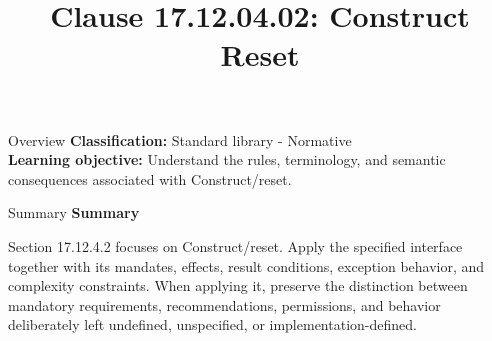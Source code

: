 \documentclass[10pt,letterpaper]{article}
\title{Clause 17.12.04.02: Construct Reset}
\author{}
\date{}
\begin{document}
\maketitle
\begin{CornellOverviewBox}{Overview}
\textbf{Classification:} Standard library - Normative\\[2pt]
\textbf{Learning objective:} Understand the rules, terminology, and semantic consequences associated with Construct/reset.
\end{CornellOverviewBox}\begin{CornellSummaryBox}{Summary}
{\sffamily\bfseries\color{Accent} Summary}\par\vspace{3pt}Section 17.12.4.2 focuses on Construct/reset. Apply the specified interface together with its mandates, effects, result conditions, exception behavior, and complexity constraints. When applying it, preserve the distinction between mandatory requirements, recommendations, permissions, and behavior deliberately left undefined, unspecified, or implementation-defined.
\end{CornellSummaryBox}
\end{document}
